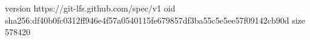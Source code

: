 version https://git-lfs.github.com/spec/v1
oid sha256:df40b0fc0312ff946e4f57a0540115fe679857df3ba55c5e5ee57f09142cb90d
size 578420
